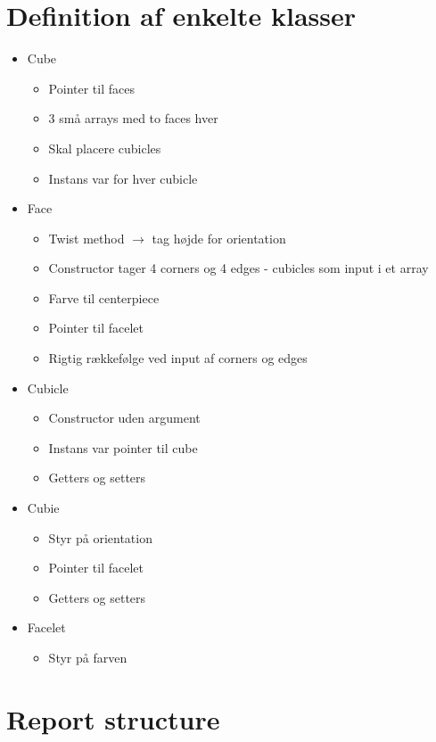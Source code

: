 \documentclass{article}
\begin{document}
\section{Definition af enkelte klasser}

\begin{itemize}
	\item Cube
	\begin{itemize}
		\item Pointer til faces
		\item 3 sm\aa{} arrays med to faces hver
		\item Skal placere cubicles
		\item Instans var for hver cubicle
	\end{itemize}
	\item Face
	\begin{itemize}
		\item Twist method $\rightarrow$ tag h\o{}jde for orientation
		\item Constructor tager 4 corners og 4 edges - cubicles som input i et array
		\item Farve til centerpiece
		\item Pointer til facelet
		\item Rigtig r\ae{}kkef\o{}lge ved input af corners og edges
	\end{itemize}
	\item Cubicle
	\begin{itemize}
		\item Constructor uden argument
		\item Instans var pointer til cube
		\item Getters og setters
	\end{itemize}
	\item Cubie
	\begin{itemize}
		\item Styr p\aa{} orientation
		\item Pointer til facelet
		\item Getters og setters
	\end{itemize}
	\item Facelet
	\begin{itemize}
		\item Styr p\aa{} farven
	\end{itemize}
\end{itemize}

\section{Report structure}
\end{document}
